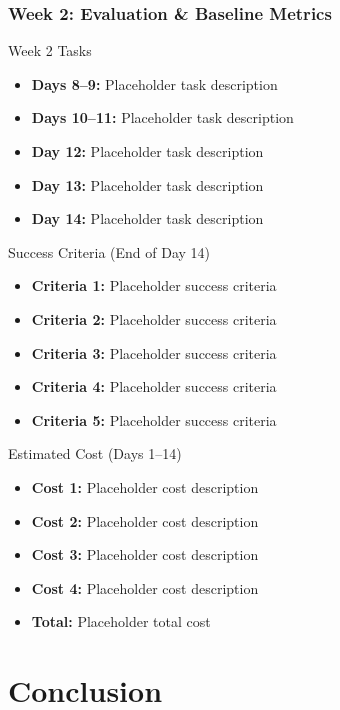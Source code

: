 \begin{frame}
\frametitle{Week 2: Evaluation \& Baseline Metrics}
\begin{block}{Week 2 Tasks}
\begin{itemize}
\item \textbf{Days 8--9:} Placeholder task description
\item \textbf{Days 10--11:} Placeholder task description
\item \textbf{Day 12:} Placeholder task description
\item \textbf{Day 13:} Placeholder task description
\item \textbf{Day 14:} Placeholder task description
\end{itemize}
\end{block}

\begin{block}{Success Criteria (End of Day 14)}
\begin{itemize}
\item \textbf{Criteria 1:} Placeholder success criteria
\item \textbf{Criteria 2:} Placeholder success criteria
\item \textbf{Criteria 3:} Placeholder success criteria
\item \textbf{Criteria 4:} Placeholder success criteria
\item \textbf{Criteria 5:} Placeholder success criteria
\end{itemize}
\end{block}

\begin{block}{Estimated Cost (Days 1--14)}
\begin{itemize}
\item \textbf{Cost 1:} Placeholder cost description
\item \textbf{Cost 2:} Placeholder cost description
\item \textbf{Cost 3:} Placeholder cost description
\item \textbf{Cost 4:} Placeholder cost description
\item \textbf{Total:} Placeholder total cost
\end{itemize}
\end{block}
\end{frame}

\section{Conclusion}\label{sec:conclusion}

